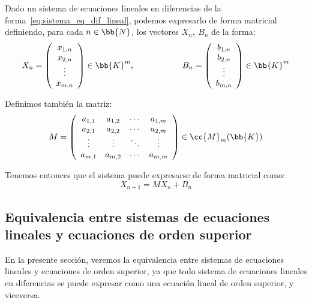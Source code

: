 Dado un sistema de ecuaciones lineales en diferencias de la forma~\ref{eq:sistema_eq_dif_lineal}, podemos expresarlo de forma matricial definiendo, para cada $n\in \bb{N}$, los vectores $X_{n},~B_n$ de la forma:
\begin{equation*}
    X_n = \left(\begin{array}{c}
        x_{1,n} \\
        x_{2,n} \\
        \vdots\\
        x_{m,n} \\
    \end{array} \right)\in \bb{K}^m,\hspace{2cm}
    B_n = \left(\begin{array}{c}
        b_{1,n} \\
        b_{2,n} \\
        \vdots\\
        b_{m,n} \\
    \end{array} \right)\in \bb{K}^m
\end{equation*}

Definimos también la matriz:
\begin{equation*}
    M = \left(\begin{array}{cccc}
        a_{1,1} & a_{1,2} & \cdots & a_{1,m} \\
        a_{2,1} & a_{2,2} & \cdots & a_{2,m} \\
        \vdots & \vdots & \ddots & \vdots \\
        a_{m,1} & a_{m,2} & \cdots & a_{m,m}
    \end{array} \right)\in \cc{M}_m(\bb{K})
\end{equation*}

Tenemos entonces que el sistema puede expresarse de forma matricial como:
\begin{equation}\label{eq:sistema_eq_linal_matricial}
    X_{n+1} = MX_n + B_n
\end{equation}


\subsection{Equivalencia entre sistemas de ecuaciones lineales y ecuaciones de orden superior}\label{sec:ecuacionesComoSistemas}
En la presente sección, veremos la equivalencia entre sistemas de ecuaciones lineales y ecuaciones de orden superior, ya que todo sistema de ecuaciones lineales en diferencias se puede expresar como una ecuación lineal de orden superior, y viceversa.

